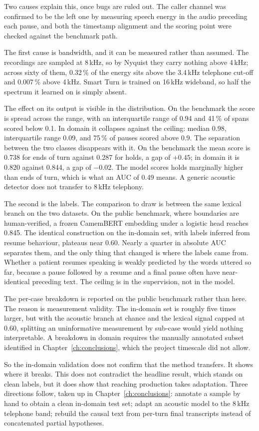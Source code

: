 Two causes explain this, once bugs are ruled out. The caller channel was confirmed to be the
left one by measuring speech energy in the audio preceding each pause, and both the
timestamp alignment and the scoring point were checked against the benchmark path.

The first cause is bandwidth, and it can be measured rather than assumed. The recordings
are sampled at 8\,kHz, so by Nyquist they carry nothing above 4\,kHz; across sixty of
them, 0.32\,\% of the energy sits above the 3.4\,kHz telephone cut-off and 0.007\,\%
above 4\,kHz. Smart Turn is trained on 16\,kHz wideband, so half the spectrum it learned
on is simply absent.

The effect on its output is visible in the distribution. On the benchmark the score is
spread across the range, with an interquartile range of 0.94 and 41\,\% of spans scored
below 0.1. In domain it collapses against the ceiling: median 0.98, interquartile range
0.09, and 75\,\% of pauses scored above 0.9. The separation between the two classes
disappears with it. On the benchmark the mean score is 0.738 for ends of turn against
0.287 for holds, a gap of $+0.45$; in domain it is 0.820 against 0.844, a gap of
$-0.02$. The model scores holds marginally higher than ends of turn, which is what an
AUC of 0.49 means. A generic acoustic detector does not transfer to 8\,kHz telephony.

The second is the labels. The comparison to draw is between the same lexical branch on the
two datasets. On the public benchmark, where boundaries are human-verified, a frozen
CamemBERT embedding under a logistic head reaches 0.845. The identical construction on the
in-domain set, with labels inferred from resume behaviour, plateaus near 0.60. Nearly a quarter
in absolute AUC separates them, and the only thing that changed is where the labels came
from. Whether a patient resumes speaking is weakly predicted by the words uttered so far,
because a pause followed by a resume and a final pause often have near-identical preceding
text. The ceiling is in the supervision, not in the model.

The per-case breakdown is reported on the public benchmark rather than here. The reason is measurement validity. The in-domain set is roughly five times larger, but with
the acoustic branch at chance and the lexical signal capped at 0.60,
splitting an uninformative measurement by sub-case would yield nothing interpretable. A
breakdown in domain requires the manually annotated subset identified in
Chapter~\ref{ch:conclusions}, which the project timescale did not allow.

So the in-domain validation does not confirm that the method transfers. It shows where it
breaks. This does not contradict the headline result, which stands on clean labels, but it
does show that reaching production takes adaptation. Three directions follow, taken up in
Chapter~\ref{ch:conclusions}: annotate a sample by hand to obtain a clean in-domain test
set; adapt an acoustic model to the 8\,kHz telephone band; rebuild the causal text from
per-turn final transcripts instead of concatenated partial hypotheses.
